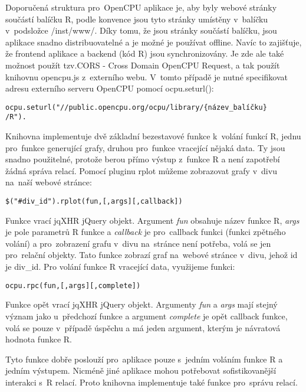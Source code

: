 \documentclass[thesis=B,czech]{FITthesis}[2012/06/26]
\begin{document}
Doporučená struktura pro~OpenCPU aplikace je, aby byly webové stránky součástí balíčku R, podle konvence jsou tyto stránky umístěny v~balíčku v~podsložce /inst/www/. Díky tomu, že jsou stránky součástí balíčku, jsou aplikace snadno distribuovatelné a je možné je používat offline. Navíc to zajišťuje, že frontend aplikace a backend (kód R) jsou synchronizovány. Je zde ale také možnost použít tzv.CORS - Cross Domain OpenCPU Request, a tak použít knihovnu opencpu.js z~externího webu. V~tomto případě je nutné specifikovat adresu externího serveru OpenCPU pomocí ocpu.seturl():\cite{OpenCPUjsLibrary}
\begin{verbatim}
ocpu.seturl("//public.opencpu.org/ocpu/library/{název_balíčku}
/R").
\end{verbatim}

Knihovna implementuje dvě základní bezestavové funkce k~volání funkcí R, jednu pro~funkce generující grafy, druhou pro~funkce vracející nějaká data. Ty jsou snadno použitelné, protože berou přímo výstup z~funkce R a není zapotřebí žádná správa relací. Pomocí pluginu rplot můžeme zobrazovat grafy v~divu na~naší webové stránce:
\begin{alltt}
\$("#div_id").rplot(fun, [,args] [,callback])
\end{alltt}
Funkce vrací jqXHR jQuery objekt. Argument \textit{fun} obsahuje název funkce R, \textit{args} je pole parametrů R funkce a \textit{callback} je pro~callback funkci (funkci zpětného volání) a pro~zobrazení grafu v~divu na~stránce není potřeba, volá se jen pro~relační objekty. Tato funkce zobrazí graf na~webové stránce v~divu, jehož id je div\_id. Pro volání funkce R vracející data, využijeme funkci:
\begin{alltt}
ocpu.rpc(fun, [,args] [,complete])
\end{alltt}
Funkce opět vrací jqXHR jQuery objekt. Argumenty \textit{fun} a \textit{args} mají stejný význam jako u~předchozí funkce a argument \textit{complete} je opět callback funkce, volá se pouze v~případě úspěchu a má jeden argument, kterým je návratová hodnota funkce R. 

Tyto funkce dobře poslouží pro~aplikace pouze s~jedním voláním funkce R a jedním výstupem. Nicméně jiné aplikace mohou potřebovat sofistikovanější interakci s~R relací. Proto knihovna implementuje také funkce pro~správu relací. 
\end{document}

